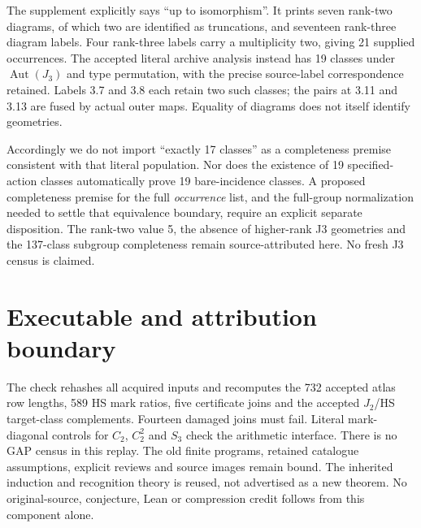\documentclass[11pt]{article}
\begin{document}
The supplement explicitly says ``up to isomorphism''. It prints seven
rank-two diagrams, of which two are identified as truncations, and
seventeen rank-three diagram labels. Four rank-three labels carry a
multiplicity two, giving 21 supplied occurrences. The accepted literal
archive analysis instead has 19 classes under
$\operatorname{Aut}(J_3)$ and type permutation, with the precise
source-label correspondence retained. Labels 3.7 and 3.8 each retain
two such classes; the pairs at 3.11 and 3.13 are fused by actual outer
maps. Equality of diagrams does not itself identify geometries.

Accordingly we do not import ``exactly 17 classes'' as a completeness
premise consistent with that literal population. Nor does the existence
of 19 specified-action classes automatically prove 19 bare-incidence
classes. A proposed completeness premise for the full \emph{occurrence}
list, and the full-group normalization needed to settle that equivalence
boundary, require an explicit separate disposition. The rank-two value
5, the absence of higher-rank J3 geometries and the 137-class subgroup
completeness remain source-attributed here. No fresh J3 census is claimed.

\section{Executable and attribution boundary}
The check rehashes all acquired inputs and recomputes the 732 accepted
atlas row lengths, 589 HS mark ratios, five certificate joins and the
accepted $J_2$/HS target-class complements. Fourteen damaged joins must
fail. Literal mark-diagonal controls for $C_2$, $C_2^2$ and $S_3$ check
the arithmetic interface. There is no GAP census in this replay.
The old finite programs, retained catalogue assumptions, explicit
reviews and source images remain bound. The inherited induction and
recognition theory is reused, not advertised as a new theorem. No
original-source, conjecture, Lean or compression credit follows from
this component alone.
\end{document}
